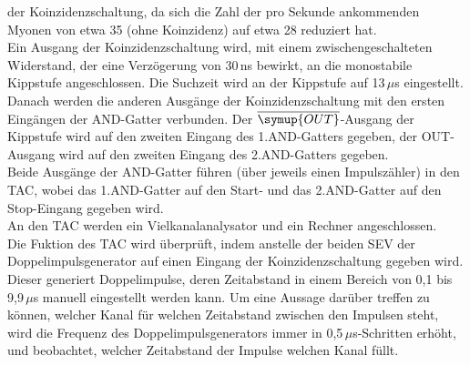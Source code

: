     der Koinzidenzschaltung, da sich die Zahl der pro Sekunde ankommenden
    Myonen von etwa 35 (ohne Koinzidenz) auf etwa 28 reduziert hat.\\
    Ein Ausgang der Koinzidenzschaltung wird, mit einem zwischengeschalteten
    Widerstand, der eine Verzögerung von 30\,ns bewirkt, an die monostabile
    Kippstufe angeschlossen. Die Suchzeit wird an der Kippstufe auf 13\,$\mu$s
    eingestellt.\\
    Danach werden die anderen Ausgänge der Koinzidenzschaltung
    mit den ersten Eingängen der AND-Gatter verbunden.
    Der $\overline{\symup{OUT}}$-Ausgang der Kippstufe wird auf den zweiten
    Eingang des 1.AND-Gatters gegeben, der OUT-Ausgang wird auf den zweiten
    Eingang des 2.AND-Gatters gegeben.\\
    Beide Ausgänge der AND-Gatter führen (über jeweils einen Impulszähler)
    in den TAC, wobei das 1.AND-Gatter auf den Start- und das 2.AND-Gatter
    auf den Stop-Eingang gegeben wird. \\
    An den TAC werden ein Vielkanalanalysator und ein Rechner angeschlossen.\\
    Die Fuktion des TAC wird überprüft, indem anstelle der beiden SEV
    der Doppelimpulsgenerator auf einen Eingang der Koinzidenzschaltung gegeben wird.
    Dieser generiert Doppelimpulse, deren Zeitabstand in einem Bereich
    von 0,1 bis 9,9\,$\mu$s manuell eingestellt werden kann.
    Um eine Aussage darüber treffen zu können, welcher Kanal für welchen
    Zeitabstand zwischen den Impulsen steht, wird die Frequenz des
    Doppelimpulsgenerators immer in 0,5\,$\mu$s-Schritten erhöht, und beobachtet,
    welcher Zeitabstand der Impulse welchen Kanal füllt.





























